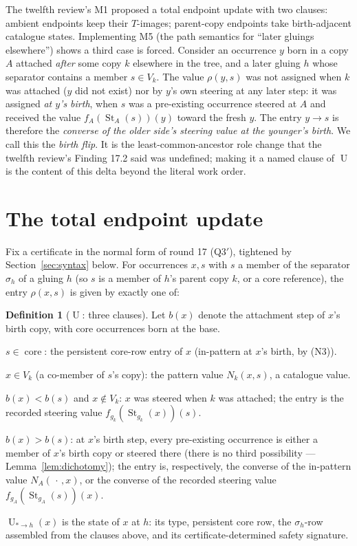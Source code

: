 \documentclass[11pt]{article}
\theoremstyle{definition}
\newtheorem{definition}[theorem]{Definition}
\newcommand{\St}{\operatorname{St}}
\newcommand{\core}{\operatorname{core}}
\newcommand{\U}{\operatorname{U}}
\begin{document}
The twelfth review's M1 proposed a total endpoint update with two
clauses: ambient endpoints keep their $T$-images; parent-copy endpoints
take birth-adjacent catalogue states.  Implementing M5 (the path
semantics for ``later gluings elsewhere'') shows a third case is
forced.  Consider an occurrence $y$ born in a copy $A$ attached
\emph{after} some copy $k$ elsewhere in the tree, and a later gluing
$h$ whose separator contains a member $s\in V_k$.  The value
$\rho(y,s)$ was not assigned when $k$ was attached ($y$ did not exist)
nor by $y$'s own steering at any later step: it was assigned \emph{at
$y$'s birth}, when $s$ was a pre-existing occurrence steered at $A$ and
received the value $f_A(\St_A(s))(y)$ toward the fresh $y$.  The entry
$y\to s$ is therefore the \emph{converse of the older side's steering
value at the younger's birth}.  We call this the \emph{birth flip}.  It
is the least-common-ancestor role change that the twelfth review's
Finding 17.2 said was undefined; making it a named clause of $\U$ is
the content of this delta beyond the literal work order.

\section{The total endpoint update}\label{sec:U}

Fix a certificate in the normal form of round 17 (Q3$'$), tightened by
Section~\ref{sec:syntax} below.  For occurrences $x,s$ with $s$ a
member of the separator $\sigma_h$ of a gluing $h$ (so $s$ is a member
of $h$'s parent copy $k$, or a core reference), the entry
$\rho(x,s)$ is given by exactly one of:

\begin{definition}[$\U$: three clauses]\label{def:U}
Let $b(x)$ denote the attachment step of $x$'s birth copy, with core
occurrences born at the base.
\begin{description}[leftmargin=2.2em,style=nextline]
\item[(U-core)] $s\in\core$: the persistent core-row entry of $x$
(in-pattern at $x$'s birth, by (N3)).
\item[(U-res)] $x\in V_k$ (a co-member of $s$'s copy): the pattern
value $N_k(x,s)$, a catalogue value.
\item[(U-down)] $b(x)<b(s)$ and $x\notin V_k$: $x$ was steered when $k$
was attached; the entry is the recorded steering value
$f_{g_k}(\St_{g_k}(x))(s)$.
\item[(U-flip)] $b(x)>b(s)$: at $x$'s birth step, every pre-existing
occurrence is either a member of $x$'s birth copy or steered there
(there is no third possibility --- Lemma~\ref{lem:dichotomy}); the
entry is, respectively, the converse of the in-pattern value
$N_{A}(\,\cdot\,,x)$, or the converse of the recorded steering value
$f_{g_A}(\St_{g_A}(s))(x)$.
\end{description}
$\U_{\!*\to h}(x)$ is the state of $x$ at $h$: its type, persistent core
row, the $\sigma_h$-row assembled from the clauses above, and its
certificate-determined safety signature.
\end{definition}
\end{document}
